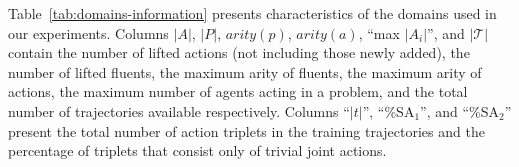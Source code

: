 \documentclass[letterpaper]{article} %
\theoremstyle{definition}
\theoremstyle{remark}
\newcommand{\roni}[1]{{\textcolor{red}{[Roni: #1]}}}
\begin{document}
Table~\ref{tab:domains-information} presents characteristics of the domains used in our experiments. 
Columns $|A|$, $|P|$, $arity(p)$, $arity(a)$, ``max $|A_i|$'', and $|\mathcal{T}|$ contain the number of lifted actions (not including those newly added), the number of lifted fluents,  the maximum arity of fluents, the maximum arity of actions, the maximum number of agents acting in a problem, and the total number of trajectories available respectively. 
Columns ``$|t|$'', ``\%SA$_1$'', and ``\%SA$_2$'' present the total number of action triplets in the training trajectories and the percentage of triplets that consist only of trivial joint actions. 

\end{document}
